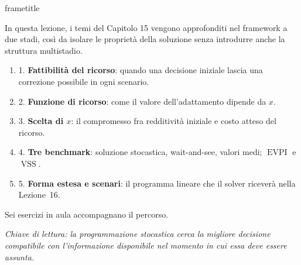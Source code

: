 \documentclass[handout]{beamer}%
\newenvironment{stepenumerate}{\begin{enumerate}[<+->]}{\end{enumerate}}
\providecommand{\EVPI}{\operatorname{EVPI}}
\providecommand{\VSS}{\operatorname{VSS}}
\providecommand{\QTR}[2]{\csname #1\endcsname{#2}}
\begin{document}
\begin{frame}%

\QTR{frametitle}{Percorso e obiettivi}

%

In questa lezione, i temi del Capitolo 15 vengono approfonditi nel framework a due stadi, cos\`i da isolare le propriet\`a della soluzione senza introdurre anche la struttura multistadio.

\begin{stepenumerate}
\item [1.] \textbf{Fattibilit\`a del ricorso}: quando una decisione iniziale
lascia una correzione possibile in ogni scenario.

\item [2.] \textbf{Funzione di ricorso}: come il valore dell'adattamento
dipende da $x$.

\item [3.] \textbf{Scelta di $x$}: il compromesso fra redditivit\`a iniziale e
costo atteso del ricorso.

\item [4.] \textbf{Tre benchmark}: soluzione stocastica, wait-and-see, valori
medi; $\EVPI$ e $\VSS$.

\item [5.] \textbf{Forma estesa e scenari}: il programma lineare che il solver
ricever\`a nella Lezione~16.
\end{stepenumerate}

\medskip

Sei esercizi in aula accompagnano il percorso.

\medskip

\begin{center}
{\small \emph{Chiave di lettura: la programmazione stocastica cerca la migliore
decisione compatibile con l'informazione disponibile nel momento in cui essa
deve essere assunta.}}
\end{center}

\transboxout%
\end{frame}%

\end{document}
